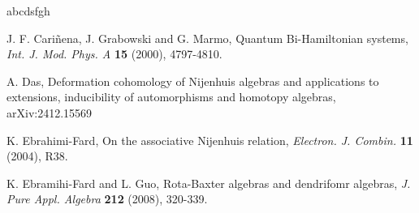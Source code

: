 \documentclass[12pt]{amsart}
\theoremstyle{definition}
\begin{document}
\begin{thebibliography}{abcdsfgh}








 J. F. Cari\~nena, J. Grabowski and G. Marmo, Quantum Bi-Hamiltonian systems, {\em Int. J. Mod. Phys. A} {\bf 15} (2000), 4797-4810.


 A. Das, Deformation cohomology of Nijenhuis algebras and applications to extensions, inducibility of automorphisms and homotopy algebras, arXiv:2412.15569 

 K. Ebrahimi-Fard, On the associative Nijenhuis relation, {\em Electron. J. Combin.} {\bf 11} (2004), R38.


 K. Ebramihi-Fard and L. Guo, Rota-Baxter algebras and dendrifomr algebras, {\em J. Pure Appl. Algebra} {\bf 212} (2008), 320-339.


\end{thebibliography}
\end{document}
